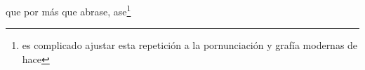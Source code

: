 que por más que abrase, ase\footnote{\textsuperscript{}es complicado ajustar esta repetición a la pornunciación y grafía modernas de hace}
